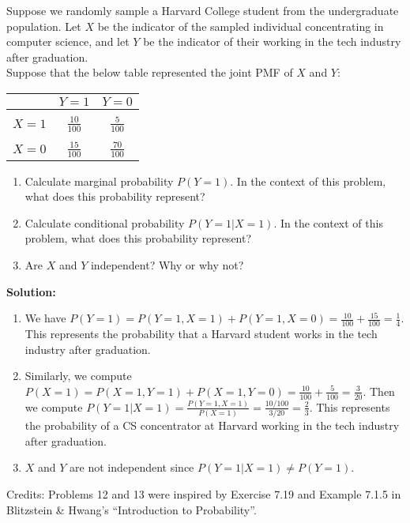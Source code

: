 \documentclass{harvardml}
\theoremstyle{definition}
\theoremstyle{plain}
\begin{document}
\begin{problem}

Suppose we randomly sample a Harvard College student from the undergraduate population.  Let $X$ be the indicator of the sampled individual concentrating in computer science, and let $Y$ be the indicator of their working in the tech industry after graduation.\\

Suppose that the below table represented the joint PMF of $X$ and $Y$:

\begin{center}
\begin{tabular}{ c | c c }
  & $Y = 1$ & $Y = 0$ \\ \hline\\
 $X = 1$ & $\frac{10}{100}$ & $\frac{5}{100}$ \\  \\
 $X = 0$ & $\frac{15}{100}$ & $\frac{70}{100}$ \\   
\end{tabular}
\end{center}

\begin{enumerate}[label=(\alph*)] 
\item Calculate marginal probability $P(Y = 1)$.  In the context of this problem, what does this probability represent?
\item Calculate conditional probability $P(Y = 1 | X = 1)$.  In the context of this problem, what does this probability represent?
\item Are $X$ and $Y$ independent?  Why or why not?

\end{enumerate}

\noindent \textbf{Solution:}
\begin{enumerate}[label=(\alph*)]
    \item We have $P(Y=1) = P(Y=1, X=1) + P(Y=1, X=0) = \frac{10}{100} + \frac{15}{100} = \frac{1}{4}$. This represents the probability that a Harvard student works in the tech industry after graduation.
    \item Similarly, we compute $P(X=1) = P(X=1, Y=1) + P(X=1, Y=0) = \frac{10}{100} + \frac{5}{100} = \frac{3}{20}$. Then we compute $P(Y=1 | X=1) = \frac{P(Y=1, X=1)}{P(X=1)} = \frac{10/100}{3/20} = \frac{2}{3}.$ This represents the probability of a CS concentrator at Harvard working in the tech industry after graduation.
    \item $X$ and $Y$ are not independent since $P(Y=1|X=1) \neq P(Y=1).$
\end{enumerate}

\end{problem}

\noindent Credits:  Problems 12 and 13 were inspired by Exercise 7.19 and  Example 7.1.5 in Blitzstein \& Hwang's ``Introduction to Probability''.
\end{document}
